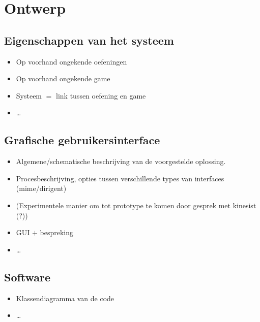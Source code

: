 \chapter{Ontwerp}

\section{Eigenschappen van het systeem}

\begin{itemize}
\item Op voorhand ongekende oefeningen
\item Op voorhand ongekende game
\item Systeem $=$ link tussen oefening en game
\item \ldots
\end{itemize}


\section{Grafische gebruikersinterface}

\begin{itemize}
\item Algemene/schematische beschrijving van de voorgestelde oplossing.
\item Procesbeschrijving, opties tussen verschillende types van interfaces (mime/dirigent)
\item (Experimentele manier om tot prototype te komen door gesprek met kinesist (?))
\item GUI $+$ bespreking
\item \ldots
\end{itemize}


\section{Software}

\begin{itemize}
\item Klassendiagramma van de code
\item \ldots
\end{itemize}